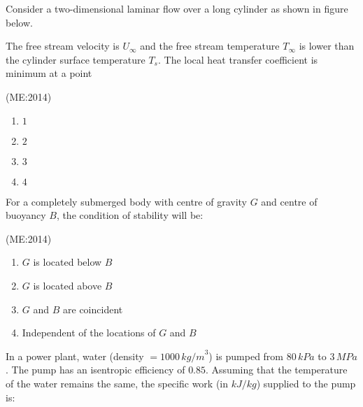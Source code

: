 \iffalse
\title{ME:2014}
\author{AI24BTECH11007}
\section{me}
\chapter{2014}
\fi
                              
	\item
		Consider a two-dimensional laminar flow over a long cylinder as shown in figure below.\\
		\vspace{0.5cm}
            \begin{center}
		    
	    \end{center}
		\vspace{0.5cm}
		The free stream velocity is $U_{\infty}$ and the free stream temperature $T_{\infty}$ is lower than the cylinder surface temperature $T_s$. The local heat transfer coefficient is minimum at a point 

		\hfill{(ME:2014)}
    \begin{multicols}{4}
    \begin{enumerate}
        \item $1$
        \item $2$
        \item $3$
        \item $4$
    \end{enumerate}
    \end{multicols}

\vspace{0.5cm}

    \item For a completely submerged body with centre of gravity $G$ and centre of buoyancy $B$, the condition of stability will be: 

	   	    
	    \hfill{(ME:2014)}
    \begin{multicols}{2}
    \begin{enumerate}
        \item $G$ is located below $B$
        \item $G$ is located above $B$
        \item $G$ and $B$ are coincident
        \item Independent of the locations of $G$ and $B$
    \end{enumerate}
    \end{multicols}
\vspace{0.5cm}
    \item In a power plant, water (density $= 1000 \, {kg/m}^3$) is pumped from $80 \, kPa$ to $3 \, MPa$. The pump has an isentropic efficiency of $0.85$. Assuming that the temperature of the water remains the same, the specific work (in $kJ/kg$) supplied to the pump is: 
	    
